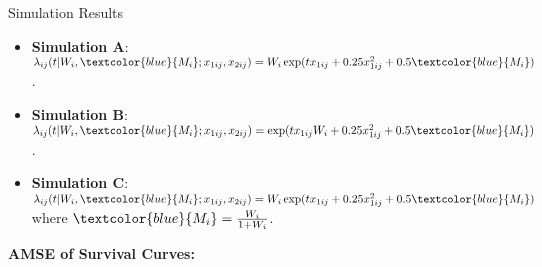 \documentclass{beamer}
\begin{document}
\begin{frame}{Simulation Results}

\begin{itemize}
    \vfill \item \textbf{Simulation A}: $\lambda_{ij}(t| W_i,\textcolor{blue}{M_i};x_{1ij},x_{2ij})= W_i \exp(t x_{1ij}+ 0.25x^2_{1ij}+0.5\textcolor{blue}{M_i})$. 
    \vfill \item \textbf{Simulation B}: $\lambda_{ij}(t| W_i,\textcolor{blue}{M_i};x_{1ij},x_{2ij})= \exp(t x_{1ij} W_i+ 0.25x^2_{1ij}+0.5\textcolor{blue}{M_i})$. 
    \vfill \item \textbf{Simulation C}: $\lambda_{ij}(t| W_i,\textcolor{blue}{M_i};x_{1ij},x_{2ij})= W_i\exp(t x_{1ij}+ 0.25x^2_{1ij}+0.5\textcolor{blue}{M_i})$ where $\textcolor{blue}{M_i}=\frac{W_i}{1+W_i}$.
\end{itemize}


\textbf{AMSE of Survival Curves: }
\begin{table}[ht]
\centering






\end{table} 


\end{frame}
        
\end{document}
